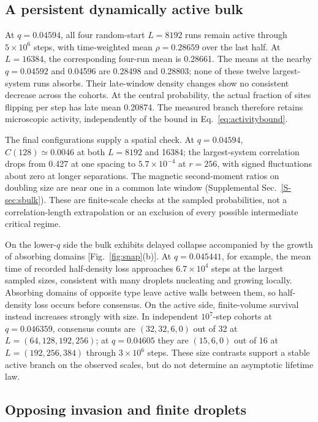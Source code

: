 

\subsection{A persistent dynamically active bulk}
\label{sec:bulk}

At $q=0.04594$, all four random-start $L=8192$ runs remain active through
$5\times10^6$ steps, with time-weighted mean $\rho=0.28659$ over the
last half. At $L=16384$, the corresponding four-run mean is 0.28661.
The means at the nearby $q=0.04592$ and 0.04596 are 0.28498 and 0.28803;
none of these twelve largest-system runs absorbs. Their late-window
density changes show no consistent decrease across the cohorts.
At the central probability, the actual fraction of sites flipping per
step has late mean 0.20874. The measured branch therefore retains
microscopic activity, independently of the bound in
Eq.~\eqref{eq:activitybound}.

The final configurations supply a spatial check.
At $q=0.04594$, $C(128)\simeq0.0046$ at both $L=8192$ and 16384;
the largest-system correlation drops from 0.427 at one spacing to
$5.7\times10^{-4}$ at $r=256$, with signed fluctuations about zero at
longer separations. The magnetic second-moment ratios on doubling size
are near one in a common late window (Supplemental Sec.~\ref{S-sec:sbulk}).
These are finite-scale checks at the sampled probabilities, not a
correlation-length extrapolation or an exclusion of every possible
intermediate critical regime.

On the lower-$q$ side the bulk exhibits delayed collapse accompanied by
the growth of absorbing domains [Fig.~\ref{fig:snap}(b)]. At
$q=0.045441$, for example, the mean time of recorded half-density loss
approaches $6.7\times10^4$ steps at the largest sampled sizes,
consistent with many droplets nucleating and growing locally.
Absorbing domains of opposite type leave active walls between them, so
half-density loss occurs before consensus.
On the active side, finite-volume survival instead increases strongly
with size. In independent $10^7$-step cohorts at $q=0.046359$, consensus
counts are $(32,32,6,0)$ out of 32 at $L=(64,128,192,256)$; at
$q=0.04605$ they are $(15,6,0)$ out of 16 at $L=(192,256,384)$ through
$3\times10^6$ steps. These size contrasts support a stable active branch
on the observed scales, but do not determine an asymptotic lifetime law.

\subsection{Opposing invasion and finite droplets}
\label{sec:opposing}

